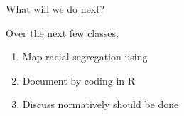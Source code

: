 \documentclass{beamer}
\newcommand\bref[2]{\href{#1}{\color{blue}{#2}}}
\begin{document}
\begin{frame}{What will we do next?}

Over the next few classes,
\begin{enumerate}
\item Map racial segregation using \bref{http://resolver.library.cornell.edu/misc/6268440}{Social Explorer}
\item Document \bref{https://info3370.github.io/lessonplans/6b/}{racial wealth gaps} by coding in R
\item Discuss normatively should be done
\end{enumerate}

\end{frame}
\end{document}
